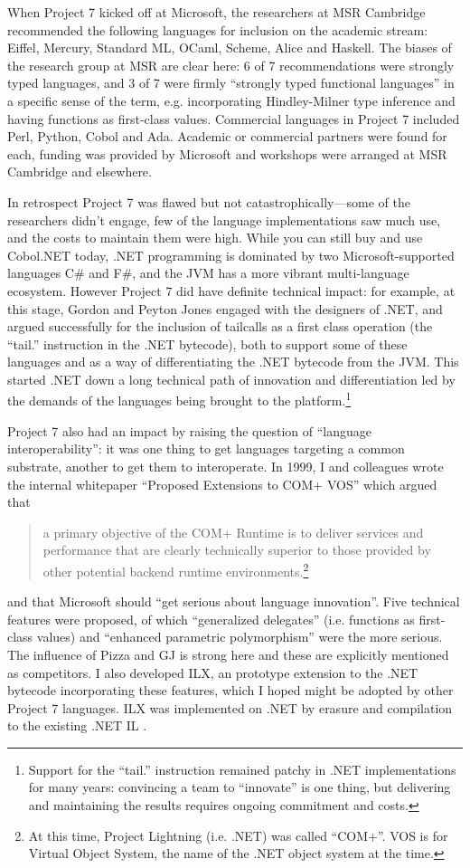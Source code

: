 \documentclass[acmsmall]{acmart}\settopmatter{}
\begin{document}
When Project 7 kicked off at Microsoft, the researchers at MSR Cambridge recommended the following languages for inclusion on the academic
stream: Eiffel, Mercury, Standard ML, OCaml, Scheme, Alice and Haskell.  The biases of the research group at MSR are clear here: 6 of 7 recommendations
were strongly typed languages, and 3 of 7 were firmly “strongly typed functional languages” in a specific sense of the term, e.g. incorporating Hindley-Milner
type inference and having functions as first-class values. Commercial languages in Project 7 included Perl, Python, Cobol and Ada. Academic or commercial
partners were found for each, funding was provided by Microsoft and workshops were arranged at MSR Cambridge and elsewhere.

In retrospect Project 7 was flawed but not catastrophically---some of the researchers didn’t engage, few of the language implementations saw much use, and
the costs to maintain them were high. While you can still buy and use Cobol.NET today, .NET programming is dominated by two Microsoft-supported
languages C\# and F\#, and the JVM has a more vibrant multi-language ecosystem. However Project 7 did have definite technical impact: for example, at
this stage, Gordon and Peyton Jones engaged with the designers of .NET, and argued successfully for the inclusion of tailcalls as a first class
operation (the “tail.” instruction in the .NET bytecode), both to support some of these languages and as a way of differentiating the .NET bytecode from the JVM.  This
started .NET down a long technical path of innovation and differentiation led by the demands of the languages being brought to the
platform.\footnote{Support for the “tail.” instruction remained patchy in .NET implementations for many years: convincing a team to ``innovate'' is one
thing, but delivering and maintaining the results requires ongoing commitment and costs.}

Project 7 also had an impact by raising the question of “language interoperability”: it was one thing to get languages targeting a common
substrate, another to get them to interoperate.  In 1999, I and colleagues wrote the internal whitepaper “Proposed Extensions
to COM+ VOS” \citep{GenericHistory} which argued that 

\begin{quote}
a primary objective of the COM+ Runtime is to deliver services and performance that are clearly technically superior to those provided by other potential backend runtime environments.\footnote{At this time, Project Lightning (i.e. .NET) was called “COM+”.  VOS is for Virtual Object System, the name of the .NET object system at the time.} 
\end{quote}
and that Microsoft should “get serious about language innovation”.  Five technical features were proposed, of which “generalized
delegates” (i.e. functions as first-class values) and “enhanced parametric polymorphism” were the more serious.  The influence of Pizza and GJ is strong here
and these are explicitly mentioned as competitors. I also developed ILX, an prototype extension to the .NET bytecode incorporating these features, which I hoped
might be adopted by other Project 7 languages. ILX was implemented on .NET by erasure and compilation to the existing .NET IL \citep{Syme2001}.
\end{document}
